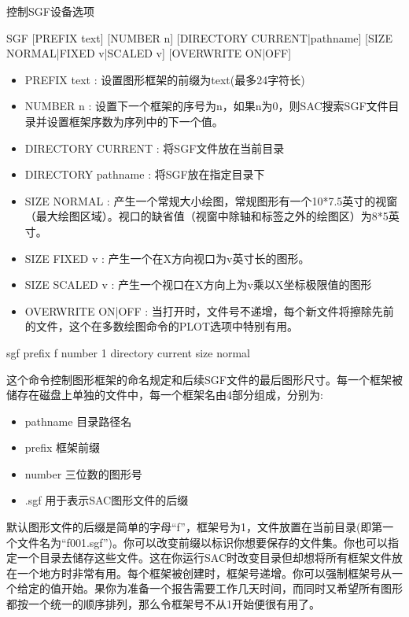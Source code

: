 \label{cmd:sgf}

控制SGF设备选项

\begin{SACSTX}
SGF [PREFIX text] [NUMBER n] [DIRECTORY CURRENT|pathname] 
    [SIZE NORMAL|FIXED v|SCALED v] [OVERWRITE ON|OFF]
\end{SACSTX}

\begin{itemize}
\item PREFIX text : 设置图形框架的前缀为text(最多24字符长)
\item NUMBER n : 设置下一个框架的序号为n，如果n为0，则SAC搜索SGF文件目录并设置框架序数为序列中的下一个值。 
\item DIRECTORY CURRENT : 将SGF文件放在当前目录 
\item DIRECTORY pathname : 将SGF放在指定目录下 
\item SIZE NORMAL : 产生一个常规大小绘图，常规图形有一个10*7.5英寸的视窗（最大绘图区域）。视口的缺省值（视窗中除轴和标签之外的绘图区）为8*5英寸。
\item SIZE FIXED v : 产生一个在X方向视口为v英寸长的图形。 
\item SIZE SCALED v : 产生一个视口在X方向上为v乘以X坐标极限值的图形  
\item OVERWRITE ON|OFF : 当打开时，文件号不递增，每个新文件将擦除先前的文件，这个在多数绘图命令的PLOT选项中特别有用。 
\end{itemize}

\begin{SACDFT}
sgf prefix f number 1 directory current size normal
\end{SACDFT}

这个命令控制图形框架的命名规定和后续SGF文件的最后图形尺寸。每一个框架被储存在磁盘上单独的文件中，每一个框架名由4部分组成，分别为:
\begin{itemize}
\item pathname 目录路径名
\item prefix 框架前缀
\item number 三位数的图形号
\item .sgf 用于表示SAC图形文件的后缀
\end{itemize}

默认图形文件的后缀是简单的字母``f''，框架号为1，文件放置在当前目录(即第一个文件名为``f001.sgf'')。你可以改变前缀以标识你想要保存的文件集。你也可以指定一个目录去储存这些文件。这在你运行SAC时改变目录但却想将所有框架文件放在一个地方时非常有用。每个框架被创建时，框架号递增。你可以强制框架号从一个给定的值开始。果你为准备一个报告需要工作几天时间，而同时又希望所有图形都按一个统一的顺序排列，那么令框架号不从1开始便很有用了。

